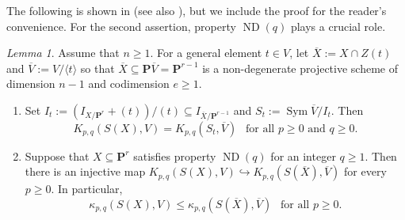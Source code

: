 \documentclass[12pt]{amsart}
\theoremstyle{definition}
\theoremstyle{remark}
\theoremstyle{corollary}
\theoremstyle{theorem}
\theoremstyle{corollary}
\newtheorem{lemma}[theorem]{Lemma}
\theoremstyle{corollary}
\theoremstyle{definition}
\theoremstyle{remark}
\numberwithin{equation}{section}
\def\nP{\mathbf{P}}
\def\Sym{\operatorname{Sym}}
\DeclareMathOperator{\ND}{ND}
\begin{document}
The following is shown in \cite[Lemma 2.19 and Theorem 2.20]{AN} (see also \cite[Remark 3.1]{NP}), but we include the proof for the reader's convenience. For the second assertion, property $\ND(q)$ plays a crucial role.

\begin{lemma}\label{lem:reduction}
Assume that $n \geq 1$. For a general element $t \in V$, let $\overline{X}:=X \cap Z(t)$ and $\overline{V}:=V/\langle t \rangle$ so that $\overline{X}\subseteq \nP \overline{V}= \nP^{r-1}$ is a non-degenerate projective scheme of dimension $n-1$ and codimension $e \geq 1$. 
\begin{enumerate}
\item[$(a)$] Set $I_t:=(I_{X/\nP^r} + (t)) /(t) \subseteq I_{\overline{X}/\nP^{r-1}}$ and $S_t:=\Sym \overline{V}/I_t$. 
Then 
$$
K_{p,q}(S(X), V) = K_{p,q}(S_t, \overline{V})~~\text{ for all $p \geq 0$ and $q \geq 0$}.
$$
\item[$(b)$] Suppose that $X \subseteq \nP^r$ satisfies property $\ND(q)$ for an integer $q \geq 1$. Then there is an injective map $K_{p,q}(S(X), V) \hookrightarrow K_{p,q}(S(\overline{X}), \overline{V})$ for every $p \geq 0$. In particular,
$$
\kappa_{p,q}(S(X), V) \leq \kappa_{p,q}(S(\overline{X}), \overline{V})~~\text{ for all $p \geq 0$}.
$$
\end{enumerate}
\end{lemma}
\end{document}
